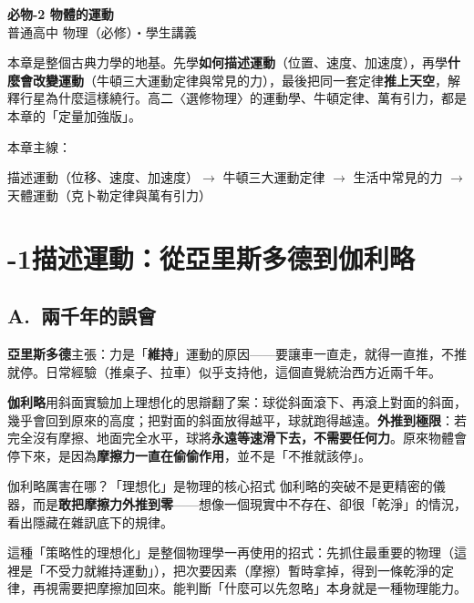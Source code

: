 \documentclass[11pt]{article}
\begin{document}
\begin{center}
{\sffamily\Huge\bfseries 必物-2 物體的運動}\\[3pt]
{\sffamily\large 普通高中 物理（必修）・學生講義}
\end{center}
\vspace{0.6em}

本章是整個古典力學的地基。先學\textbf{如何描述運動}（位置、速度、加速度），再學\textbf{什麼會改變運動}（牛頓三大運動定律與常見的力），最後把同一套定律\textbf{推上天空}，解釋行星為什麼這樣繞行。高二〈選修物理〉的運動學、牛頓定律、萬有引力，都是本章的「定量加強版」。

\medskip
本章主線：

\begin{center}
描述運動（位移、速度、加速度）$\rightarrow$ 牛頓三大運動定律 $\rightarrow$ 生活中常見的力 $\rightarrow$ 天體運動（克卜勒定律與萬有引力）
\end{center}

\section*{-1\quad 描述運動：從亞里斯多德到伽利略}

\subsection*{\sffamily A.\ 兩千年的誤會}

\textbf{亞里斯多德}主張：力是「\textbf{維持}」運動的原因——要讓車一直走，就得一直推，不推就停。日常經驗（推桌子、拉車）似乎支持他，這個直覺統治西方近兩千年。

\textbf{伽利略}用斜面實驗加上理想化的思辯翻了案：球從斜面滾下、再滾上對面的斜面，幾乎會回到原來的高度；把對面的斜面放得越平，球就跑得越遠。\textbf{外推到極限}：若完全沒有摩擦、地面完全水平，球將\textbf{永遠等速滑下去，不需要任何力}。原來物體會停下來，是因為\textbf{摩擦力一直在偷偷作用}，並不是「不推就該停」。

\begin{補充框}{伽利略厲害在哪？「理想化」是物理的核心招式}
伽利略的突破不是更精密的儀器，而是\textbf{敢把摩擦力外推到零}——想像一個現實中不存在、卻很「乾淨」的情況，看出隱藏在雜訊底下的規律。

這種「策略性的理想化」是整個物理學一再使用的招式：先抓住最重要的物理（這裡是「不受力就維持運動」），把次要因素（摩擦）暫時拿掉，得到一條乾淨的定律，再視需要把摩擦加回來。能判斷「什麼可以先忽略」本身就是一種物理能力。
\end{補充框}
\end{document}
